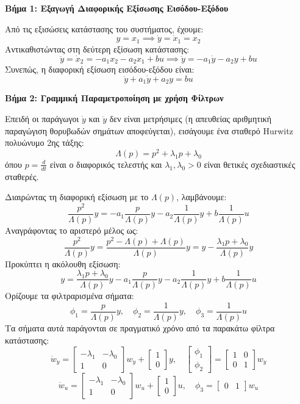 \documentclass[a4paper,11pt]{article}
\begin{document}
\begin{answer}
\textbf{Βήμα 1: Εξαγωγή Διαφορικής Εξίσωσης Εισόδου-Εξόδου}

Από τις εξισώσεις κατάστασης του συστήματος, έχουμε:
\[ y = x_1 \implies \dot{y} = \dot{x}_1 = x_2 \]
Αντικαθιστώντας στη δεύτερη εξίσωση κατάστασης:
\[ \ddot{y} = \dot{x}_2 = -a_1 x_2 - a_2 x_1 + b u \implies \ddot{y} = -a_1 \dot{y} - a_2 y + b u \]
Συνεπώς, η διαφορική εξίσωση εισόδου-εξόδου είναι:
\[ \ddot{y} + a_1 \dot{y} + a_2 y = b u \]

\textbf{Βήμα 2: Γραμμική Παραμετροποίηση με χρήση Φίλτρων}

Επειδή οι παράγωγοι $\dot{y}$ και $\ddot{y}$ δεν είναι μετρήσιμες (η απευθείας αριθμητική παραγώγιση θορυβωδών σημάτων αποφεύγεται), εισάγουμε ένα σταθερό Hurwitz πολυώνυμο 2ης τάξης:
\[ \Lambda(p) = p^2 + \lambda_1 p + \lambda_0 \]
όπου $p = \frac{d}{dt}$ είναι ο διαφορικός τελεστής και $\lambda_1, \lambda_0 > 0$ είναι θετικές σχεδιαστικές σταθερές. 

Διαιρώντας τη διαφορική εξίσωση με το $\Lambda(p)$, λαμβάνουμε:
\[ \frac{p^2}{\Lambda(p)} y = -a_1 \frac{p}{\Lambda(p)} y - a_2 \frac{1}{\Lambda(p)} y + b \frac{1}{\Lambda(p)} u \]
Αναγράφοντας το αριστερό μέλος ως:
\[ \frac{p^2}{\Lambda(p)} y = \frac{p^2 - \Lambda(p) + \Lambda(p)}{\Lambda(p)} y = y - \frac{\lambda_1 p + \lambda_0}{\Lambda(p)} y \]
Προκύπτει η ακόλουθη εξίσωση:
\[ y = \frac{\lambda_1 p + \lambda_0}{\Lambda(p)} y - a_1 \frac{p}{\Lambda(p)} y - a_2 \frac{1}{\Lambda(p)} y + b \frac{1}{\Lambda(p)} u \]
Ορίζουμε τα φιλτραρισμένα σήματα:
\[ \phi_1 = \frac{p}{\Lambda(p)} y, \quad \phi_2 = \frac{1}{\Lambda(p)} y, \quad \phi_3 = \frac{1}{\Lambda(p)} u \]
Τα σήματα αυτά παράγονται σε πραγματικό χρόνο από τα παρακάτω φίλτρα κατάστασης:
\[ \dot{w}_{y} = \begin{bmatrix} -\lambda_1 & -\lambda_0 \\ 1 & 0 \end{bmatrix} w_y + \begin{bmatrix} 1 \\ 0 \end{bmatrix} y, \quad \begin{bmatrix} \phi_1 \\ \phi_2 \end{bmatrix} = \begin{bmatrix} 1 & 0 \\ 0 & 1 \end{bmatrix} w_y \]
\[ \dot{w}_{u} = \begin{bmatrix} -\lambda_1 & -\lambda_0 \\ 1 & 0 \end{bmatrix} w_u + \begin{bmatrix} 1 \\ 0 \end{bmatrix} u, \quad \phi_3 = \begin{bmatrix} 0 & 1 \end{bmatrix} w_u \]


\end{answer}
\end{document}
